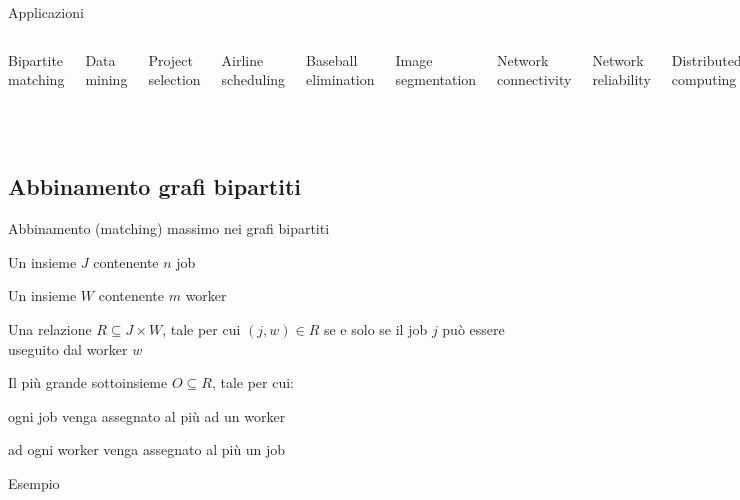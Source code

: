 \begin{frame}{Applicazioni}

\begin{columns}[T]
\BIL
\item Bipartite matching
\item Data mining
\item Project selection
\item Airline scheduling
\item Baseball elimination
\item Image segmentation
\item Network connectivity
\EIL
{}
\BIL
\item Network reliability
\item Distributed computing
\item Egalitarian stable matching
\item Security of statistical data
\item Network intrusion detection
\item Multi-camera scene reconstruction
\item Gene function prediction
\EIL
\end{columns}

\end{frame}

\subsection{Abbinamento grafi bipartiti}

\begin{frame}{Abbinamento (matching) massimo nei grafi bipartiti}

\BIL
\item Un insieme $J$ contenente $n$ job
\item Un insieme $W$ contenente $m$ worker
\item Una relazione $R \subseteq J \times W$, tale per cui $(j,w) \in R$
se e solo se il job $j$ può essere useguito dal worker $w$
\EIL

\bigskip
{}
\BIL
\item Il più grande sottoinsieme $O \subseteq R$, tale per cui:
  \BI
  \item ogni job venga assegnato al più ad un worker
  \item ad ogni worker venga assegnato al più un job
  \EI
\EIL

\end{frame}
  
\begin{frame}{Esempio}
  
  
\end{frame}
    


